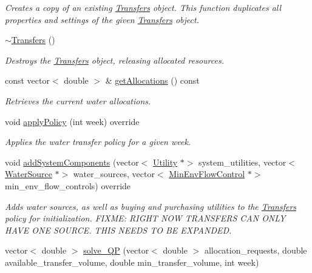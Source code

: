 \begin{DoxyCompactItemize}
\begin{DoxyCompactList}\small\item\em Creates a copy of an existing \mbox{\hyperlink{classTransfers}{Transfers}} object. This function duplicates all properties and settings of the given \mbox{\hyperlink{classTransfers}{Transfers}} object. \end{DoxyCompactList}\item 
\mbox{\hyperlink{classTransfers_a5dfeafe7a9b9a446b1ab746b65ef3b4b}{$\sim$\+Transfers}} ()
\begin{DoxyCompactList}\small\item\em Destroys the \mbox{\hyperlink{classTransfers}{Transfers}} object, releasing allocated resources. \end{DoxyCompactList}\item 
const vector$<$ double $>$ \& \mbox{\hyperlink{classTransfers_abb5bd2978727424dc524c401dca0cbaf}{get\+Allocations}} () const
\begin{DoxyCompactList}\small\item\em Retrieves the current water allocations. \end{DoxyCompactList}\item 
void \mbox{\hyperlink{classTransfers_ad9e4e83ff763ac1ba518a19051cd2e69}{apply\+Policy}} (int week) override
\begin{DoxyCompactList}\small\item\em Applies the water transfer policy for a given week. \end{DoxyCompactList}\item 
void \mbox{\hyperlink{classTransfers_a3c1930dbeb1273c1c0be93ad5ca57357}{add\+System\+Components}} (vector$<$ \mbox{\hyperlink{classUtility}{Utility}} $\ast$$>$ system\+\_\+utilities, vector$<$ \mbox{\hyperlink{classWaterSource}{Water\+Source}} $\ast$$>$ water\+\_\+sources, vector$<$ \mbox{\hyperlink{classMinEnvFlowControl}{Min\+Env\+Flow\+Control}} $\ast$$>$ min\+\_\+env\+\_\+flow\+\_\+controls) override
\begin{DoxyCompactList}\small\item\em Adds water sources, as well as buying and purchasing utilities to the \mbox{\hyperlink{classTransfers}{Transfers}} policy for initialization. F\+I\+X\+ME\+: R\+I\+G\+HT N\+OW T\+R\+A\+N\+S\+F\+E\+RS C\+AN O\+N\+LY H\+A\+VE O\+NE S\+O\+U\+R\+CE. T\+H\+IS N\+E\+E\+DS TO BE E\+X\+P\+A\+N\+D\+ED. \end{DoxyCompactList}\item 
vector$<$ double $>$ \mbox{\hyperlink{classTransfers_a06f965588350cc854f3bf3d619416fdc}{solve\+\_\+\+QP}} (vector$<$ double $>$ allocation\+\_\+requests, double available\+\_\+transfer\+\_\+volume, double min\+\_\+transfer\+\_\+volume, int week)
$$
\end{DoxyCompactItemize}
